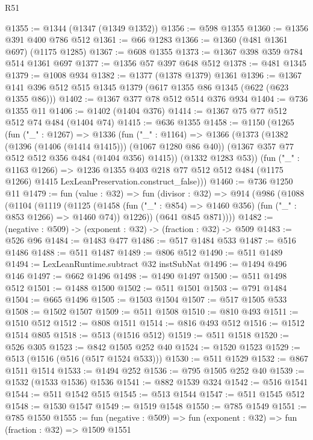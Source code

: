 \begin{lexlean}{R51}
\begin{coremodule}
@1355 := @1344 (@1347 (@1349 @1352))
@1356 := @598 @1355
@1360 := @1356 @391 @400 @786 @512
@1361 := @66 @1283
@1366 := @1360 (@481 @1361 @697) (@1175 @1285)
@1367 := @608 @1355
@1373 := @1367 @398 @359 @784 @514 @1361 @697
@1377 := @1356 @57 @397 @648 @512
@1378 := @481 @1345
@1379 := @1008 @934
@1382 := @1377 (@1378 @1379) @1361
@1396 := @1367 @141 @396 @512 @515 @1345 @1379 (@617 @1355 @86 @1345 (@622 (@623 @1355 @86)))
@1402 := @1367 @377 @78 @512 @514 @376 @934
@1404 := @736 @1355 @11
@1406 := @1402 (@1404 @376)
@1414 := @1367 @75 @77 @512 @512 @74 @484 (@1404 @74)
@1415 := @636 @1355
@1458 := @1150
    (@1265
      (fun ("_" : @1267) =>
      @1336
        (fun ("_" : @1164) =>
        @1366
          (@1373
            (@1382 (@1396 (@1406 (@1414 @1415))) (@1067 @1280 @86 @40))
            (@1367 @357 @77 @512 @512 @356 @484 (@1404 @356) @1415))
          (@1332 @1283 @53))
        (fun ("_" : @1163 @1266) =>
        @1236
          @1355
          @403
          @218
          @77
          @512
          @512
          @484
          (@1175 @1266)
          @1415
          LexLeanPreservation.construct_false)))
@1460 := @736 @1250 @11
@1479 := fun (value : @32) =>
  fun (divisor : @32) =>
  @914
    (@986
      (@1088
        (@1104
          (@1119
            (@1125
              (@1458 (fun ("_" : @854) => @1460 @356) (fun ("_" : @853 @1266) => @1460 @74))
              @1226))
          (@641 @845 @871))))
@1482 := (negative : @509) -> (exponent : @32) -> (fraction : @32) -> @509
@1483 := @526 @96
@1484 := @1483 @477
@1486 := @517 @1484 @533
@1487 := @516 @1486
@1488 := @511 @1487
@1489 := @806 @512
@1490 := @511 @1489
@1494 := LexLeanRuntime.subtract @32 instSubNat
@1496 := @1494 @496 @146
@1497 := @662 @1496
@1498 := @1490 @1497
@1500 := @511 @1498 @512
@1501 := @1488 @1500
@1502 := @511 @1501
@1503 := @791 @1484
@1504 := @665 @1496
@1505 := @1503 @1504
@1507 := @517 @1505 @533
@1508 := @1502 @1507
@1509 := @511 @1508
@1510 := @810 @493
@1511 := @1510 @512
@1512 := @808 @1511
@1514 := @816 @493 @512
@1516 := @1512 @1514 @805
@1518 := @513 (@1516 @512)
@1519 := @511 @1518
@1520 := @526 @305
@1523 := @842 @1505 @252 @40
@1524 := @1520 @1523
@1529 := @513 (@1516 (@516 (@517 @1524 @533)))
@1530 := @511 @1529
@1532 := @867 @1511 @1514
@1533 := @1494 @252
@1536 := @795 @1505 @252 @40
@1539 := @1532 (@1533 @1536) @1536
@1541 := @882 @1539 @324
@1542 := @516 @1541
@1544 := @511 @1542 @515
@1545 := @513 @1544
@1547 := @511 @1545 @512
@1548 := @1530 @1547
@1549 := @1519 @1548
@1550 := @785 @1549
@1551 := @785 @1550
@1555 := fun (negative : @509) => fun (exponent : @32) => fun (fraction : @32) => @1509 @1551

\end{coremodule}
\end{lexlean}
